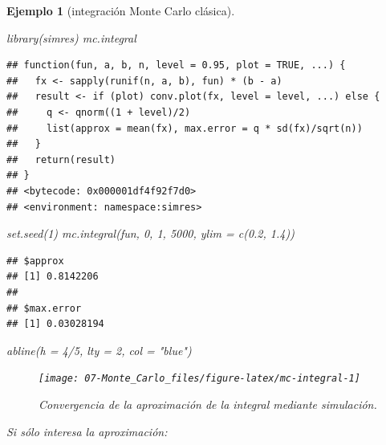 \documentclass[
]{book}
\newenvironment{Shaded}{\begin{snugshade}}{\end{snugshade}}
\newcommand{\AttributeTok}[1]{\textcolor[rgb]{0.77,0.63,0.00}{#1}}
\newcommand{\DecValTok}[1]{\textcolor[rgb]{0.00,0.00,0.81}{#1}}
\newcommand{\FloatTok}[1]{\textcolor[rgb]{0.00,0.00,0.81}{#1}}
\newcommand{\FunctionTok}[1]{\textcolor[rgb]{0.00,0.00,0.00}{#1}}
\newcommand{\NormalTok}[1]{#1}
\newcommand{\SpecialCharTok}[1]{\textcolor[rgb]{0.00,0.00,0.00}{#1}}
\newcommand{\StringTok}[1]{\textcolor[rgb]{0.31,0.60,0.02}{#1}}
\theoremstyle{break}
\newtheorem{example}{Ejemplo}[chapter]
\theoremstyle{nonumberplain}
\begin{document}
\begin{example}[integración Monte Carlo clásica]
\begin{Shaded}
\begin{Highlighting}[]
\FunctionTok{library}\NormalTok{(simres)}
\NormalTok{mc.integral}
\end{Highlighting}
\end{Shaded}

\begin{verbatim}
## function(fun, a, b, n, level = 0.95, plot = TRUE, ...) {
##   fx <- sapply(runif(n, a, b), fun) * (b - a)
##   result <- if (plot) conv.plot(fx, level = level, ...) else {
##     q <- qnorm((1 + level)/2)
##     list(approx = mean(fx), max.error = q * sd(fx)/sqrt(n))
##   }
##   return(result)
## }
## <bytecode: 0x000001df4f92f7d0>
## <environment: namespace:simres>
\end{verbatim}

\begin{Shaded}
\begin{Highlighting}[]
\FunctionTok{set.seed}\NormalTok{(}\DecValTok{1}\NormalTok{)}
\FunctionTok{mc.integral}\NormalTok{(fun, }\DecValTok{0}\NormalTok{, }\DecValTok{1}\NormalTok{, }\DecValTok{5000}\NormalTok{, }\AttributeTok{ylim =} \FunctionTok{c}\NormalTok{(}\FloatTok{0.2}\NormalTok{, }\FloatTok{1.4}\NormalTok{))}
\end{Highlighting}
\end{Shaded}

\begin{verbatim}
## $approx
## [1] 0.8142206
## 
## $max.error
## [1] 0.03028194
\end{verbatim}

\begin{Shaded}
\begin{Highlighting}[]
\FunctionTok{abline}\NormalTok{(}\AttributeTok{h =} \DecValTok{4}\SpecialCharTok{/}\DecValTok{5}\NormalTok{, }\AttributeTok{lty =} \DecValTok{2}\NormalTok{, }\AttributeTok{col =} \StringTok{"blue"}\NormalTok{)}
\end{Highlighting}
\end{Shaded}

\begin{figure}[!htb]

{\centering \texttt{[image: 07-Monte\_Carlo\_files/figure-latex/mc-integral-1]} 

}

\caption{Convergencia de la aproximación de la integral mediante simulación.}\label{fig:mc-integral}
\end{figure}

Si sólo interesa la aproximación:


\end{example}
\end{document}
